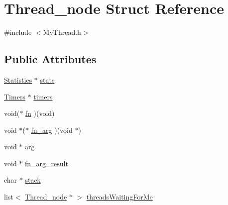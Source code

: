 \hypertarget{structThread__node}{\section{Thread\-\_\-node Struct Reference}
\label{structThread__node}
}


{\ttfamily \#include $<$My\-Thread.\-h$>$}

\subsection*{Public Attributes}
\begin{DoxyCompactItemize}
\item 
\hyperlink{structStatistics}{Statistics} $\ast$ \hyperlink{structThread__node_a02ad13262955a13452a09c69f5e02f4a}{stats}
\item 
\hyperlink{structTimers}{Timers} $\ast$ \hyperlink{structThread__node_a76a12b75a2dd6b8b8b065bd69e8fce40}{timers}
\item 
void($\ast$ \hyperlink{structThread__node_a959c697a0166014fd7838fedf7f5c08e}{fn} )(void)
\item 
void $\ast$($\ast$ \hyperlink{structThread__node_ab154ce9419df7bced9fb62008f0d5db3}{fn\-\_\-arg} )(void $\ast$)
\item 
void $\ast$ \hyperlink{structThread__node_aea9c75d845ef5ab44fba09356d192148}{arg}
\item 
void $\ast$ \hyperlink{structThread__node_a7decd53bf84dae7fb43b666395514158}{fn\-\_\-arg\-\_\-result}
\item 
char $\ast$ \hyperlink{structThread__node_ae1c95ac5f94f422f88c3001d97bc7339}{stack}
\item 
list$<$ \hyperlink{structThread__node}{Thread\-\_\-node} $\ast$ $>$ \hyperlink{structThread__node_a8eac456fc2a97193b14cba7ad0ef44a0}{threads\-Waiting\-For\-Me}
\end{DoxyCompactItemize}


